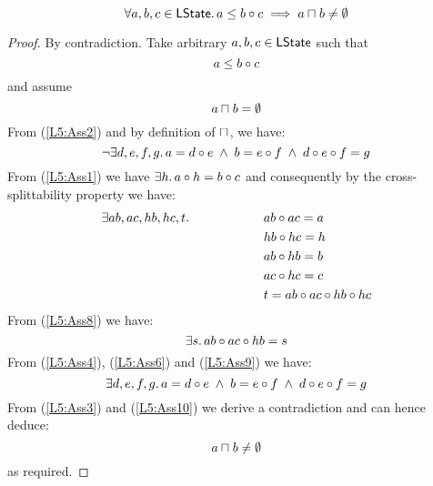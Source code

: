 %
%

%
%
\begin{lemma}[]\label{lem:nonEmptyOverlap}
%
\[
	\forall a, b, c \in \textsf{LState}.\, a \leq b \circ c \implies a \sqcap_{} b \not= \emptyset
\]
%
\begin{proof} By contradiction.
Take arbitrary $a, b, c \in \textsf{LState}$ such that 
%
\begin{equation}
	a \leq b \circ c \label{L5:Ass1}
\end{equation}
%
and assume
%
\begin{equation}
	a \sqcap_{} b = \emptyset \label{L5:Ass2}
\end{equation}
%
From (\ref{L5:Ass2}) and by definition of $\sqcap_{}$, we have:
%
\begin{equation}
	\neg\exists d, e, f, g.\, a = d \circ e \;\land\; b = e \circ f \;\land\; d \circ e \circ f = g \label{L5:Ass3}
\end{equation}
%
From (\ref{L5:Ass1}) we have $\exists h.\, a \circ h = b \circ c$ and consequently by the cross-splittability property we have:
%
\begin{align}
	\exists ab, ac, hb, hc, t.\, \hspace*{2cm}&
	ab \circ ac = a 	\label{L5:Ass4}\\
	& hb \circ hc = h \label{L5:Ass5}\\
	& ab \circ hb = b \label{L5:Ass6}\\
	& ac \circ hc = c \label{L5:Ass7}\\
	& t = ab \circ ac \circ hb \circ hc \label{L5:Ass8}
\end{align}
%
From (\ref{L5:Ass8}) we have:
%
\begin{equation}
	\exists s.\, ab \circ ac \circ hb = s \label{L5:Ass9}
\end{equation}
%
From (\ref{L5:Ass4}), (\ref{L5:Ass6}) and (\ref{L5:Ass9}) we have: 
%
\begin{equation}
	\exists d, e, f, g.\, a = d \circ e \;\land\; b = e \circ f \;\land\; d \circ e \circ f = g \label{L5:Ass10}
\end{equation}
%
From (\ref{L5:Ass3}) and (\ref{L5:Ass10}) we derive a contradiction and can hence deduce:
%
\begin{equation}
	a \sqcap_{} b \not= \emptyset \nonumber
\end{equation}
%
as required.
\end{proof}
\end{lemma}
%
%
